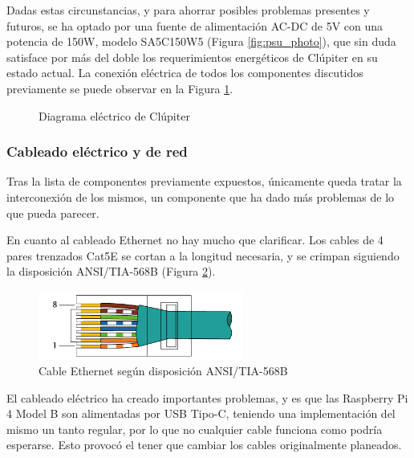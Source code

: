 Dadas estas circunstancias, y para ahorrar posibles problemas presentes y futuros, se ha optado por una fuente de alimentación AC-DC de 5V con una potencia de 150W, modelo SA5C150W5 (Figura \ref{fig:psu_photo}), que sin duda satisface por más del doble los requerimientos energéticos de Clúpiter en su estado actual. La conexión eléctrica de todos los componentes discutidos previamente se puede observar en la Figura \ref{fig:raspi_electric_diagram}.

\begin{figure}[h!]
  \centering
  \vspace*{0.5cm}
  \def\svgwidth{\textwidth}
  
  \caption{Diagrama eléctrico de Clúpiter}
  \label{fig:raspi_electric_diagram}
\end{figure}

\subsubsection{Cableado eléctrico y de red}
\label{sssec:cableado_electrico_red}
Tras la lista de componentes previamente expuestos, únicamente queda tratar la interconexión de los mismos, un componente que ha dado más problemas de lo que pueda parecer.

En cuanto al cableado Ethernet no hay mucho que clarificar. Los cables de 4 pares trenzados Cat5E se cortan a la longitud necesaria, y se crimpan siguiendo la disposición ANSI/TIA-568B (Figura \ref{fig:TIA-568B-horiz}).

\begin{figure}[h!]
  \centering
  \includegraphics[width=0.6\textwidth]{img/TIA-568B-horizontal.png}
  \caption{Cable Ethernet según disposición ANSI/TIA-568B}
  \label{fig:TIA-568B-horiz}
\end{figure}

El cableado eléctrico ha creado importantes problemas, y es que las Raspberry Pi 4 Model B son alimentadas por USB Tipo-C, teniendo una implementación del mismo un tanto regular, por lo que no cualquier cable funciona como podría esperarse. Esto provocó el tener que cambiar los cables originalmente planeados.

